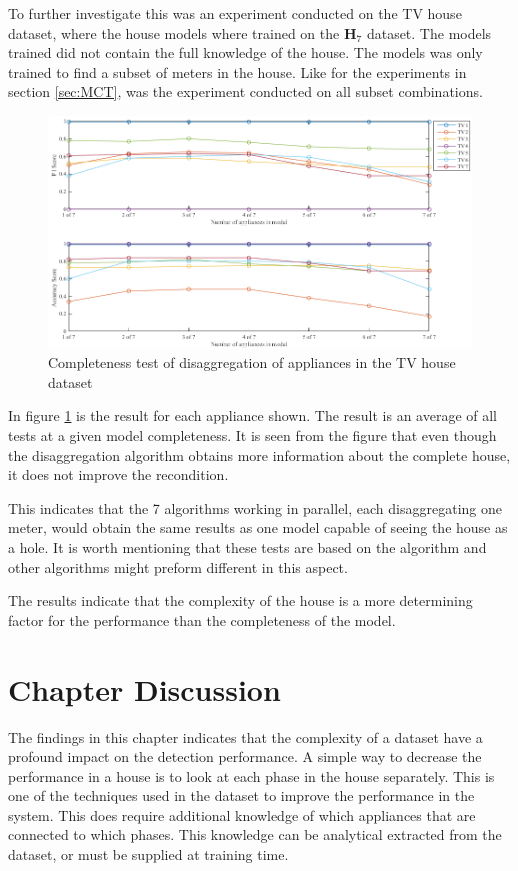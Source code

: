 To further investigate this was an experiment conducted on the TV house dataset, where the house models where trained on the $\textbf{H}_{7}$ dataset. The models trained did not contain the full knowledge of the house. The models was only trained to find a subset of meters in the house. Like for the experiments in section \ref{sec:MCT}, was the experiment conducted on all subset combinations. 

\begin{figure}[H]
\centering
\includegraphics[width=1\textwidth]{billeder/ModelCompletness.png}
\caption{Completeness test of disaggregation of appliances in the TV house dataset }
\label{fig:COD}
\end{figure}

In figure \ref{fig:COD} is the result for each appliance shown. The result is an average of all tests at a given model completeness. It is seen from the figure that even though the disaggregation algorithm obtains more information about the complete house, it does not improve the recondition. 

This indicates that the 7 algorithms working in parallel, each disaggregating one meter, would obtain the same results as one model capable of seeing the house as a hole. It is worth mentioning that these tests are based on the  algorithm and other algorithms might preform different in this aspect. 

The results indicate that the complexity of the house is a more determining factor for the performance than the completeness of the model. 

\section{Chapter Discussion}
The findings in this chapter indicates that the complexity of a dataset have a profound impact on the detection performance. A simple way to decrease the performance in a house is to look at each phase in the house separately. This is one of the techniques used in the  dataset to improve the performance in the system. This does require additional knowledge of which appliances that are connected to which phases. This knowledge can be analytical extracted from the dataset, or must be supplied at training time. 

